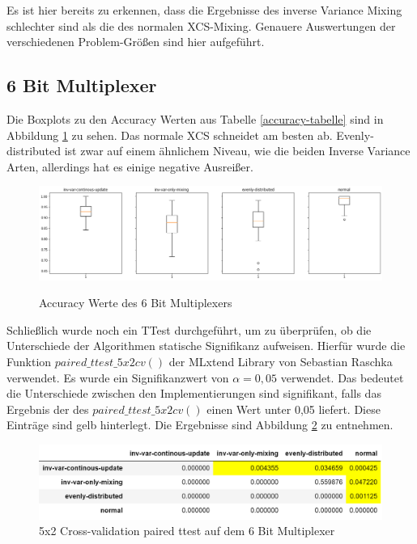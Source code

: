 \documentclass{ocsmnar}
\begin{document}
Es ist hier bereits zu erkennen, dass die Ergebnisse des inverse Variance Mixing schlechter sind als die des normalen XCS-Mixing. 
Genauere Auswertungen der verschiedenen Problem-Größen sind hier aufgeführt. 

\subsection{6 Bit Multiplexer}
Die Boxplots zu den Accuracy Werten aus Tabelle \ref{accuracy-tabelle} sind in Abbildung \ref{boxplot-6-bit} zu sehen. Das normale XCS schneidet am besten ab. Evenly-distributed ist zwar auf einem ähnlichem Niveau, wie die beiden Inverse Variance Arten, allerdings hat es einige negative Ausreißer. 


\begin{figure}
    \includegraphics[width=\linewidth]{img/boxplot_6Bitpng.png}
    \caption{Accuracy Werte des 6 Bit Multiplexers}
    \label{boxplot-6-bit}
\end{figure}

Schließlich wurde noch ein TTest durchgeführt, um zu überprüfen, ob die Unterschiede der Algorithmen statische Signifikanz aufweisen. Hierfür wurde die Funktion $paired\_ttest\_5x2cv()$ der MLxtend Library von Sebastian Raschka verwendet. Es wurde ein Signifikanzwert von $\alpha = 0,05$ verwendet. Das bedeutet die Unterschiede zwischen den Implementierungen sind signifikant, falls das Ergebnis der des $paired\_ttest\_5x2cv()$ einen Wert unter 0,05 liefert. Diese Einträge sind gelb hinterlegt. Die Ergebnisse sind Abbildung \ref{ttest-6-bit} zu entnehmen. 

\begin{figure}
    \includegraphics[width=\linewidth]{img/ttest_6_bit.png}
    \caption{5x2 Cross-validation paired ttest auf dem 6 Bit Multiplexer}\label{ttest-6-bit}
\end{figure}
\end{document}
